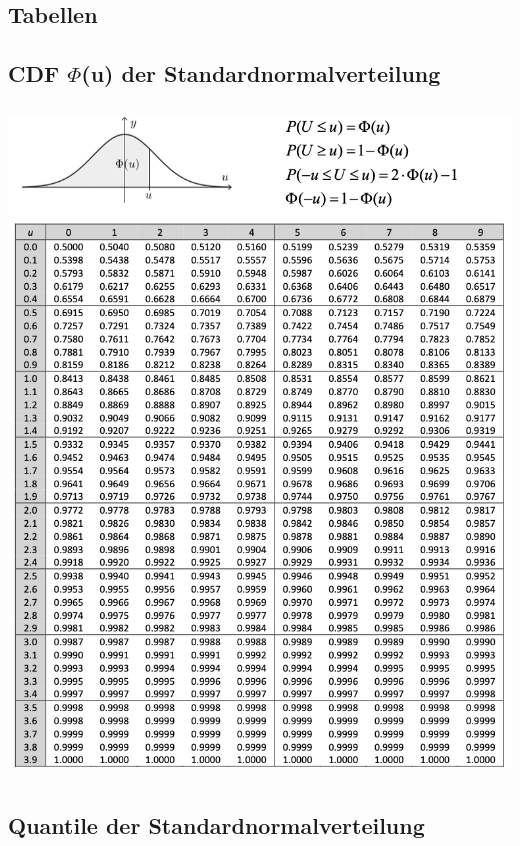 \documentclass[8pt,a4paper]{scrartcl}
\begin{document}
\begin{multicols*}{2}
\setlength{\columnseprule}{0.4pt}

\section{Tabellen}
	\subsection{CDF $\Phi$(u) der Standardnormalverteilung}

		\includegraphics[height=17.75cm]{img/Standardnormalverteilung.png}

	\subsection{Quantile der Standardnormalverteilung}


\end{multicols*}
\end{document}
